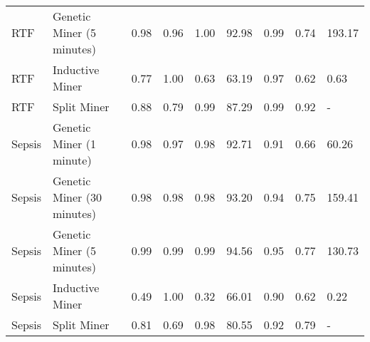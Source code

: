 \begin{tabular}{llrrrrrrl}
RTF & Genetic Miner (5 minutes) & 0.98 & 0.96 & 1.00 & 92.98 & 0.99 & 0.74 & 193.17 \\
RTF & Inductive Miner & 0.77 & 1.00 & 0.63 & 63.19 & 0.97 & 0.62 & 0.63 \\
RTF & Split Miner & 0.88 & 0.79 & 0.99 & 87.29 & 0.99 & 0.92 & - \\
Sepsis & Genetic Miner (1 minute) & 0.98 & 0.97 & 0.98 & 92.71 & 0.91 & 0.66 & 60.26 \\
Sepsis & Genetic Miner (30 minutes) & 0.98 & 0.98 & 0.98 & 93.20 & 0.94 & 0.75 & 159.41 \\
Sepsis & Genetic Miner (5 minutes) & 0.99 & 0.99 & 0.99 & 94.56 & 0.95 & 0.77 & 130.73 \\
Sepsis & Inductive Miner & 0.49 & 1.00 & 0.32 & 66.01 & 0.90 & 0.62 & 0.22 \\
Sepsis & Split Miner & 0.81 & 0.69 & 0.98 & 80.55 & 0.92 & 0.79 & - \\
\bottomrule
\end{tabular}
